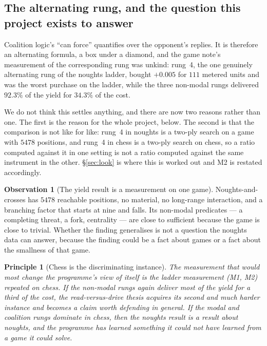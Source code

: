 \documentclass[11pt,a4paper]{article}
\theoremstyle{plain}
\newtheorem{principle}[theorem]{Principle}
\theoremstyle{definition}
\newtheorem{observation}[theorem]{Observation}
\theoremstyle{remark}
\begin{document}
\subsection{The alternating rung, and the question this project exists to answer}
\label{sec:altrung}

Coalition logic's ``can force'' quantifies over the opponent's replies. It is
therefore an alternating formula, a box under a diamond, and the game note's
measurement of the corresponding rung was unkind: rung~4, the one genuinely
alternating rung of the noughts ladder, bought $+0.005$ for $111$ metered units
and was the worst purchase on the ladder, while the three non-modal rungs
delivered $92.3\%$ of the yield for $34.3\%$ of the cost.

We do not think this settles anything, and there are now two reasons rather than
one. The first is the reason for the whole project, below. The second is that
the comparison is not like for like: rung~4 in noughts is a two-ply search on a
game with $5478$ positions, and rung~4 in chess is a two-ply search on chess, so
a ratio computed against it in one setting is not a ratio computed against the
same instrument in the other. \S\ref{sec:look} is where this is worked out and
M2 is restated accordingly.

\begin{observation}[The yield result is a measurement on one game]
\label{obs:onegame}
Noughts-and-crosses has $5478$ reachable positions, no material, no long-range
interaction, and a branching factor that starts at nine and falls. Its non-modal
predicates --- a completing threat, a fork, centrality --- are close to
sufficient because the game is close to trivial. Whether the finding generalises
is not a question the noughts data can answer, because the finding could be a
fact about games or a fact about the smallness of that game.
\end{observation}

\begin{principle}[Chess is the discriminating instance]
\label{prin:discriminate}
The measurement that would most change the programme's view of itself is the
ladder measurement (M1, M2) repeated on chess. If the non-modal rungs again
deliver most of the yield for a third of the cost, the read-versus-drive thesis
acquires its second and much harder instance and becomes a claim worth defending
in general. If the modal and coalition rungs dominate in chess, then the noughts
result is a result about noughts, and the programme has learned something it
could not have learned from a game it could solve.
\end{principle}
\end{document}
